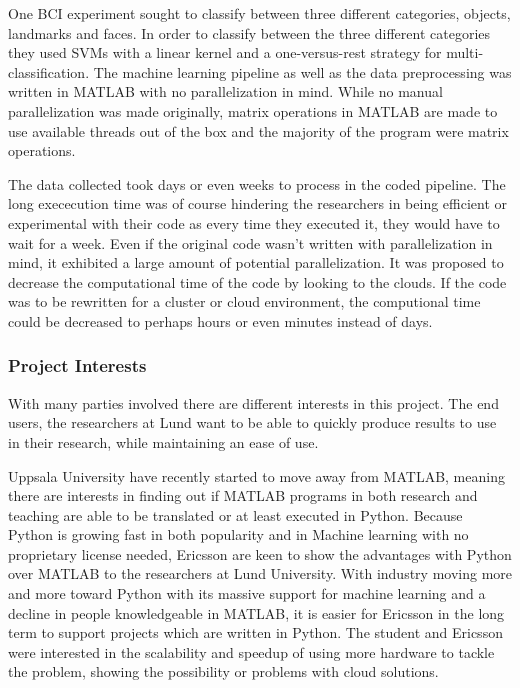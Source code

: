 \documentclass[12pt, a4paper]{article}
\begin{document}
One BCI experiment sought to classify between three different categories, objects, landmarks and faces.
In order to classify between the three different categories they used SVMs with a linear kernel and a one-versus-rest strategy for multi-classification.
The machine learning pipeline as well as the data preprocessing was written in MATLAB with no parallelization in mind.
While no manual parallelization was made originally, matrix operations in MATLAB are made to use available threads out of the box and the majority of the program were matrix operations.

The data collected took days or even weeks to process in the coded pipeline.
The long exececution time was of course hindering the researchers in being efficient or experimental with their code as every time they executed it, they would have to wait for a week.
Even if the original code wasn't written with parallelization in mind, it exhibited a large amount of potential parallelization.
It was proposed to decrease the computational time of the code by looking to the clouds.
If the code was to be rewritten for a cluster or cloud environment, the computional time could be decreased to perhaps hours or even minutes instead of days.

\subsubsection{Project Interests}

With many parties involved there are different interests in this project.
The end users, the researchers at Lund want to be able to quickly produce results to use in their research, while maintaining an ease of use.

Uppsala University have recently started to move away from MATLAB, meaning there are interests in finding out if MATLAB programs in both research and teaching are able to be translated or at least executed in Python.
Because Python is growing fast in both popularity and in Machine learning with no proprietary license needed, Ericsson are keen to show the advantages with Python over MATLAB to the researchers at Lund University.
With industry moving more and more toward Python with its massive support for machine learning and a decline in people knowledgeable in MATLAB, it is easier for Ericsson in the long term to support projects which are written in Python.
The student and Ericsson were interested in the scalability and speedup of using more hardware to tackle the problem, showing the possibility or problems with cloud solutions.
\end{document}
